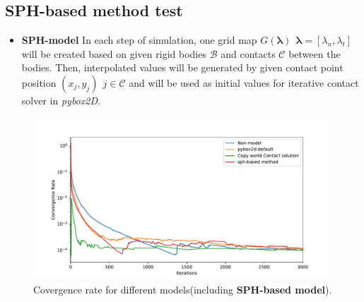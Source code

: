 \subsection{SPH-based method test}
    \begin{itemize}
         \item \textbf{SPH-model} In each step of simulation, one grid map $G(\mathbf{\pmb{\lambda}})~~\pmb{\lambda} = [\lambda_n, \lambda_t]$ will be created based on given rigid bodies $\mathcal{B}$ and contacts $\mathcal{C}$ between the bodies. Then, interpolated values will be generated by given contact point position $(x_j, y_j)~~j \in \mathcal{C}$ and will be used as initial values for iterative contact solver in \textit{pybox2D}. 
    \end{itemize}
     \begin{figure}[!ht]
        \centering
        \includegraphics[scale = 0.4]{Figures/addsph}
        \caption{Covergence rate for different models(including \textbf{SPH-based model}).}
        \label{fg:addsph}
    \end{figure}
